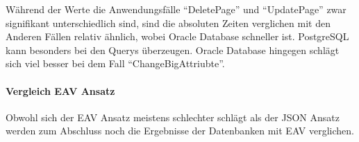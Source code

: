 Während der Werte die Anwendungsfälle ``DeletePage'' und ``UpdatePage'' zwar signifikant unterschiedlich sind, sind die absoluten Zeiten verglichen mit den Anderen Fällen relativ ähnlich, wobei Oracle Database schneller ist. PostgreSQL kann besonders bei den Querys überzeugen. Oracle Database hingegen schlägt sich viel besser bei dem Fall ``ChangeBigAttriubte''.



\begin{table}[h]
\caption{P-Werte der Alternativhypothesen des Mann-Whitney-U-Tests für den Vergleich PostgreSQL und Oracle Database, Ansatz JSON}
\centering
{}
\label{tab:mwDatabasesJSON}
\end{table}

\paragraph{Vergleich EAV Ansatz}

Obwohl sich der EAV Ansatz meistens schlechter schlägt als der JSON Ansatz werden zum Abschluss noch die Ergebnisse der Datenbanken mit EAV verglichen.

